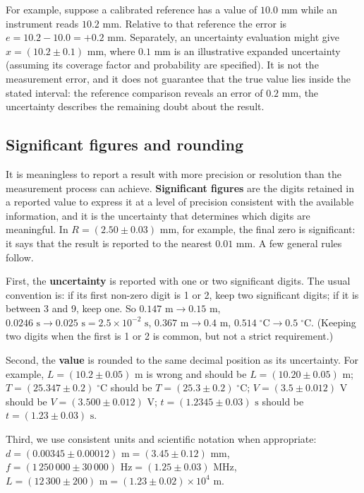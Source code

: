 \documentclass[letterpaper,11pt,leqno]{book}
\begin{document}
For example, suppose a calibrated reference has a value of $10.0\text{ mm}$ while an instrument reads $10.2\text{ mm}$. Relative to that reference the error is $e = 10.2 - 10.0 = +0.2\text{ mm}$. Separately, an uncertainty evaluation might give $x = (10.2 \pm 0.1)\text{ mm}$, where $0.1\text{ mm}$ is an illustrative expanded uncertainty (assuming its coverage factor and probability are specified). It is not the measurement error, and it does not guarantee that the true value lies inside the stated interval: the reference comparison reveals an error of $0.2\text{ mm}$, the uncertainty describes the remaining doubt about the result.

\subsection{Significant figures and rounding}

It is meaningless to report a result with more precision or resolution than the measurement process can achieve. \textbf{Significant figures} are the digits retained in a reported value to express it at a level of precision consistent with the available information, and it is the uncertainty that determines which digits are meaningful. In $R = (2.50 \pm 0.03)\text{ mm}$, for example, the final zero is significant: it says that the result is reported to the nearest $0.01\text{ mm}$. A few general rules follow.

First, the \textbf{uncertainty} is reported with one or two significant digits. The usual convention is: if its first non-zero digit is 1 or 2, keep two significant digits; if it is between 3 and 9, keep one. So $0.147\text{ m} \to 0.15\text{ m}$, $0.0246\text{ s} \to 0.025\text{ s} = 2.5 \times 10^{-2}\text{ s}$, $0.367\text{ m} \to 0.4\text{ m}$, $0.514\;^\circ\text{C} \to 0.5\;^\circ\text{C}$. (Keeping two digits when the first is 1 or 2 is common, but not a strict requirement.)

Second, the \textbf{value} is rounded to the same decimal position as its uncertainty. For example, $L = (10.2 \pm 0.05)\text{ m}$ is wrong and should be $L = (10.20 \pm 0.05)\text{ m}$; $T = (25.347 \pm 0.2)\;^\circ\text{C}$ should be $T = (25.3 \pm 0.2)\;^\circ\text{C}$; $V = (3.5 \pm 0.012)\text{ V}$ should be $V = (3.500 \pm 0.012)\text{ V}$; $t = (1.2345 \pm 0.03)\text{ s}$ should be $t = (1.23 \pm 0.03)\text{ s}$.

Third, we use consistent units and scientific notation when appropriate: $d = (0.00345 \pm 0.00012)\text{ m} = (3.45 \pm 0.12)\text{ mm}$, $f = (1\,250\,000 \pm 30\,000)\text{ Hz} = (1.25 \pm 0.03)\text{ MHz}$, $L = (12\,300 \pm 200)\text{ m} = (1.23 \pm 0.02) \times 10^4\text{ m}$.
\end{document}
